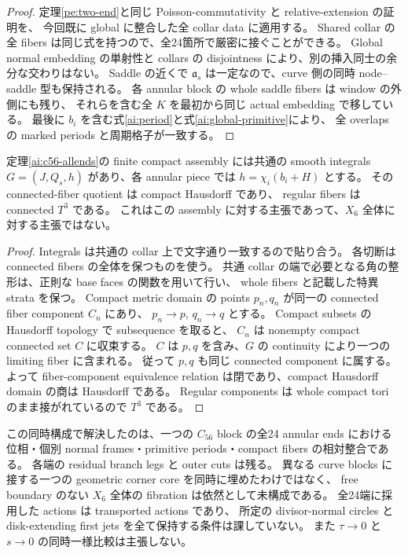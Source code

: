 \begin{proof}
定理\ref{pe:two-end}と同じ Poisson-commutativity と relative-extension の証明を、
今回既に global に整合した全 collar data に適用する。
Shared collar の全 fibers は同じ式を持つので、全24箇所で厳密に接ぐことができる。
Global normal embedding の単射性と collars の disjointness により、別の挿入同士の余分な交わりはない。
Saddle の近くで $\mathfrak a_s$ は一定なので、curve 側の同時 node--saddle 型も保持される。
各 annular block の whole saddle fibers は window の外側にも残り、
それらを含む全 $K$ を最初から同じ actual embedding で移している。
最後に $b_i$ を含む式\eqref{ai:period}と式\eqref{ai:global-primitive}により、
全 overlaps の marked periods と周期格子が一致する。
\end{proof}

\begin{corollary}
\label{ai:assembly-quotient}
定理\ref{ai:c56-allends}の finite compact assembly には共通の smooth integrals
$G=(J,Q_s,h)$ があり、各 annular piece では
$h=\chi_i(b_i+H)$ とする。
その connected-fiber quotient は compact Hausdorff であり、
regular fibers は connected $T^3$ である。
これはこの assembly に対する主張であって、$X_6$ 全体に対する主張ではない。
\end{corollary}

\begin{proof}
Integrals は共通の collar 上で文字通り一致するので貼り合う。
各切断は connected fibers の全体を保つものを使う。
共通 collar の端で必要となる角の整形は、正則な base faces の関数を用いて行い、
whole fibers と記載した特異 strata を保つ。
Compact metric domain の points $p_n,q_n$ が同一の connected fiber component $C_n$ にあり、
$p_n\to p$, $q_n\to q$ とする。
Compact subsets の Hausdorff topology で subsequence を取ると、
$C_n$ は nonempty compact connected set $C$ に収束する。
$C$ は $p,q$ を含み、$G$ の continuity により一つの limiting fiber に含まれる。
従って $p,q$ も同じ connected component に属する。
よって fiber-component equivalence relation は閉であり、compact Hausdorff domain の商は Hausdorff である。
Regular components は whole compact tori のまま接がれているので $T^3$ である。
\end{proof}

\begin{remark}\label{ai:all24-scope}
この同時構成で解決したのは、一つの $C_{56}$ block の全24 annular ends における
位相・個別 normal frames・primitive periods・compact fibers の相対整合である。
各端の residual branch legs と outer cuts は残る。
異なる curve blocks に接する一つの geometric corner core を同時に埋めたわけではなく、
free boundary のない $X_6$ 全体の fibration は依然として未構成である。
全24端に採用した actions は transported actions であり、
所定の divisor-normal circles と disk-extending first jets を全て保持する条件は課していない。
また $\tau\to0$ と $s\to0$ の同時一様比較は主張しない。
\end{remark}
